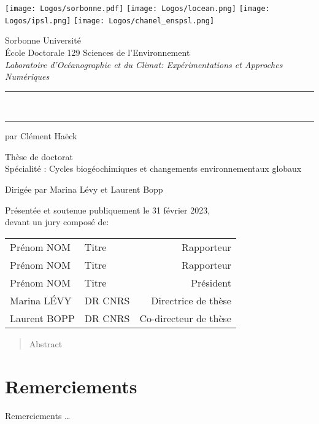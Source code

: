 

\begin{titlingpage}

\begin{center}
  \texttt{[image: Logos/sorbonne.pdf]}
  \hfill
  \texttt{[image: Logos/locean.png]}
  \hfill
  \texttt{[image: Logos/ipsl.png]}
  \hfill
  \texttt{[image: Logos/chanel\_enspsl.png]}

  \vspace{3em}

  {\LARGE Sorbonne Université}\\[2ex]
  École Doctorale 129 Sciences de l'Environnement\\
  \emph{Laboratoire d'Océanographie et du Climat: Expérimentations et Approches Numériques}

  \vspace{3em}

  \par\noindent\rule[0.7em]{\textwidth}{2pt}
  {\bfseries\Large \Title}\\
  \par\noindent\rule{\textwidth}{2pt}

  \vspace{1em}

  {\normalsize par Clément Haëck}\\
  \vspace{3em}

  Thèse de doctorat\\
  Spécialité : Cycles biogéochimiques et changements environnementaux globaux

  \vspace{3em}

  Dirigée par Marina Lévy et Laurent Bopp

  \vspace{3em}
\end{center}

\par\noindent Présentée et soutenue publiquement le 31 février 2023,\\
devant un jury composé de:\\[1ex]
\begin{center}
\begin{tabular}{llr<{\raggedleft}}
  Prénom NOM & Titre & Rapporteur \\
  Prénom NOM & Titre & Rapporteur \\
  Prénom NOM & Titre & Président \\
  Marina LÉVY & DR CNRS & Directrice de thèse \\
  Laurent BOPP & DR CNRS & Co-directeur de thèse \\
\end{tabular}
\end{center}

\end{titlingpage}
\restoregeometry

\frontmatter

\begin{abstract}
Abstract
\end{abstract}

\clearpage
\section*{Remerciements}
Remerciements \dots
